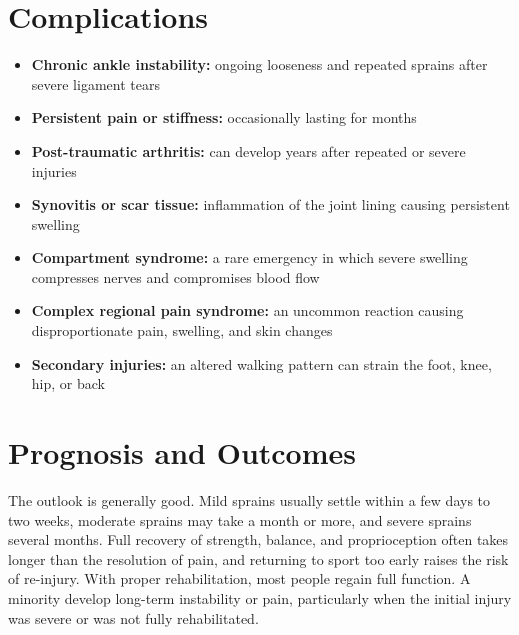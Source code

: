 \section*{Complications}
\begin{itemize}
    \item \textbf{Chronic ankle instability:} ongoing looseness and repeated sprains after severe ligament tears
    \item \textbf{Persistent pain or stiffness:} occasionally lasting for months
    \item \textbf{Post-traumatic arthritis:} can develop years after repeated or severe injuries
    \item \textbf{Synovitis or scar tissue:} inflammation of the joint lining causing persistent swelling
    \item \textbf{Compartment syndrome:} a rare emergency in which severe swelling compresses nerves and compromises blood flow
    \item \textbf{Complex regional pain syndrome:} an uncommon reaction causing disproportionate pain, swelling, and skin changes
    \item \textbf{Secondary injuries:} an altered walking pattern can strain the foot, knee, hip, or back
\end{itemize}

\section*{Prognosis and Outcomes}
The outlook is generally good. Mild sprains usually settle within a few days to two weeks, moderate sprains may take a month or more, and severe sprains several months. Full recovery of strength, balance, and proprioception often takes longer than the resolution of pain, and returning to sport too early raises the risk of re-injury. With proper rehabilitation, most people regain full function. A minority develop long-term instability or pain, particularly when the initial injury was severe or was not fully rehabilitated.

